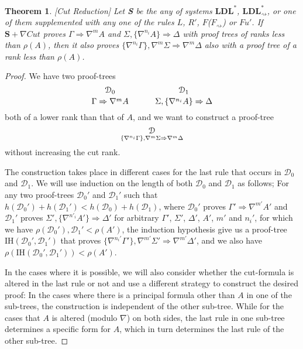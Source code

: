 \documentclass[12pt,a4paper]{article}
\theoremstyle{plain}
\newtheorem{thm}{Theorem}[section]
\theoremstyle{definition}
\begin{document}
\begin{thm}\label{thm:ldls-cut-reduction}[Cut Reduction]
Let \textbf{S} be the any of systems $\mathbf{LDL}^{*}$, $\mathbf{LDL}^{*}_{\rightsquigarrow}$, or one of them supplemented with any one of the rules $L$, $R'$, $F$($F_\rightsquigarrow$) or $Fu'$. If $\mathbf{S} + \nabla Cut$ proves $\Gamma \Rightarrow \nabla^m A$ and $\Sigma , \{\nabla^{n_i} A\} \Rightarrow \Delta$ with proof trees of ranks less than $\rho(A)$, then it also proves $\{\nabla^{n_i} \Gamma\} , \nabla^m\Sigma \Rightarrow \nabla^m\Delta$ also with a proof tree of a rank less than $\rho(A)$.
\end{thm}
\begin{proof}
	We have two proof-trees
  \[
    {\mathcal{D}_0
    \atop
    \Gamma \Rightarrow \nabla^m A}
    \hspace{3em}
    {\mathcal{D}_1
    \atop
    \Sigma , \{\nabla^{n_i} A\} \Rightarrow \Delta}
  \]
  both of a lower rank than that of $A$, and we want to construct a proof-tree
  \[\mathcal{D} \atop \{\nabla^{n_i} \Gamma\} , \nabla^m \Sigma \Rightarrow \nabla^m \Delta \]
  without increasing the cut rank.

  The construction takes place in different cases for the last rule that occurs in $\mathcal{D}_0$ and $\mathcal{D}_1$. 
  We will use induction on the length of both $\mathcal{D}_0$ and $\mathcal{D}_1$ as follows; For any two proof-trees $\mathcal{D}_0'$ and $\mathcal{D}_1'$ such that $h(\mathcal{D}_0') + h(\mathcal{D}_1') < h(\mathcal{D}_0) + h(\mathcal{D}_1)$, where $\mathcal{D}_0'$ proves $\Gamma' \Rightarrow \nabla^{m'} A'$ and $\mathcal{D}_1'$ proves $\Sigma', \{\nabla^{n'_i} A'\} \Rightarrow \Delta'$ for arbitrary $\Gamma'$, $\Sigma'$, $\Delta'$, $A'$, $m'$ and $n_i'$, for which we have $\rho(\mathcal{D}_0'),\mathcal{D}_1' < \rho(A')$, the induction hypothesis give us a proof-tree $\text{IH}(\mathcal{D}_0', \mathcal{D}_1')$ that proves $\{\nabla^{n_i'}\Gamma'\}, \nabla^{m'} \Sigma' \Rightarrow \nabla^{m'} \Delta'$, and we also have $\rho(\text{IH}(\mathcal{D}_0', \mathcal{D}_1')) < \rho(A')$.

  In the cases where it is possible, we will also consider whether the cut-formula is altered in the last rule or not and use a different strategy to construct the desired proof: In the cases where there is a principal formula other than $A$ in one of the sub-trees, the construction is independent of the other sub-tree. While for the cases that $A$ is altered (modulo $\nabla$) on both sides, the last rule in one sub-tree determines a specific form for $A$, which in turn determines the last rule of the other sub-tree.
  

\end{proof}
\end{document}

